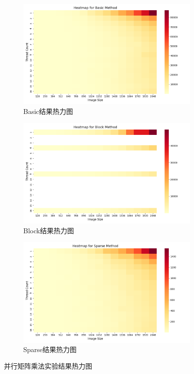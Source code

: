 \documentclass[a4paper, utf8]{ctexart}
\begin{document}
	\begin{figure}
		\centering
		\begin{subfigure}{.32\textwidth}
			\centering
			\includegraphics[width=.9\textwidth]{./figure/result1-Basic.png}
			\caption{Basic结果热力图}
		\end{subfigure}
		\begin{subfigure}{.32\textwidth}
			\centering
			\includegraphics[width=.9\textwidth]{./figure/result1-Block.png}
			\caption{Block结果热力图}
		\end{subfigure}
		\begin{subfigure}{.32\textwidth}
			\centering
			\includegraphics[width=.9\textwidth]{./figure/result1-Sparse.png}
			\caption{Sparse结果热力图}
		\end{subfigure}
		\caption{并行矩阵乘法实验结果热力图}
	\end{figure}
	
\end{document}
